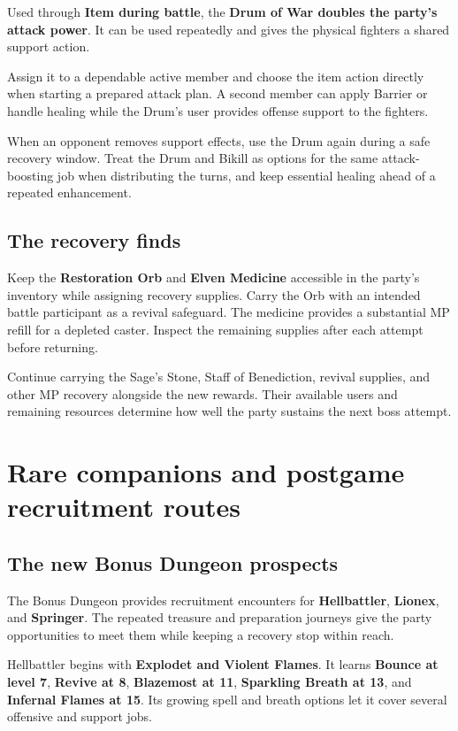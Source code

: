Used through \textbf{Item during battle}, the
\textbf{Drum of War doubles the party's attack power}.
It can be used repeatedly and gives the physical
fighters a shared support action.

Assign it to a dependable active member and choose
the item action directly when starting a prepared
attack plan. A second member can apply Barrier or
handle healing while the Drum's user provides offense
support to the fighters.

When an opponent removes support effects, use the
Drum again during a safe recovery window. Treat the
Drum and Bikill as options for the same attack-boosting
job when distributing the turns, and keep essential
healing ahead of a repeated enhancement.

\subsection*{The recovery finds}

Keep the \textbf{Restoration Orb} and \textbf{Elven Medicine}
accessible in the party's inventory while assigning
recovery supplies. Carry the Orb with an intended battle
participant as a revival safeguard. The medicine provides
a substantial MP refill for a depleted caster. Inspect
the remaining supplies after each attempt before returning.

Continue carrying the Sage's Stone, Staff of Benediction,
revival supplies, and other MP recovery alongside the
new rewards. Their available users and remaining resources
determine how well the party sustains the next boss attempt.

\section{Rare companions and postgame recruitment routes}

\subsection*{The new Bonus Dungeon prospects}

The Bonus Dungeon provides recruitment encounters for
\textbf{Hellbattler}, \textbf{Lionex}, and \textbf{Springer}.
The repeated treasure and preparation journeys give the
party opportunities to meet them while keeping a recovery
stop within reach.

Hellbattler begins with \textbf{Explodet and Violent Flames}.
It learns \textbf{Bounce at level 7}, \textbf{Revive at 8},
\textbf{Blazemost at 11}, \textbf{Sparkling Breath at 13},
and \textbf{Infernal Flames at 15}. Its growing spell
and breath options let it cover several offensive and
support jobs.

